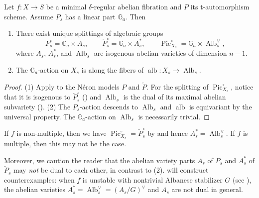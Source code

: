 \documentclass[reqno, letterpaper]{amsart}
\numberwithin{equation}{subsection}
\let\to\longrightarrow
\newcommand{\GG}{\mathbb{G}}
\DeclareMathOperator{\Pic}{Pic}
\DeclareMathOperator{\Alb}{Alb}
\DeclareMathOperator{\alb}{alb}
\begin{document}
		\begin{proposition} \label{prop:splitting and albanese}
			Let $f : X \to S$ be a minimal $\delta$-regular abelian fibration and $P$ its t-automorphism scheme. Assume $P_s$ has a linear part $\GG_a$. Then
			\begin{enumerate}
				\item There exist unique splittings of algebraic groups
				\[ P^\circ_s = \GG_a \times A_s ,\qquad \check P^\circ_s = \GG_a \times A_s^* ,\qquad \Pic^\circ_{X_s} = \GG_a \times \Alb_s^\vee ,\]
				where $A_s$, $A_s^*$, and $\Alb_s$ are isogenous abelian varieties of dimension $n-1$.
				\item The $\GG_a$-action on $X_s$ is along the fibers of $\alb : X_s \to \Alb_s$.
			\end{enumerate}
		\end{proposition}
		\begin{proof}
			(1) Apply  to the N\'eron models $P$ and $\check P$. For the splitting of $\Pic^\circ_{X_s}$, notice that it is isogenous to $\check P^\circ_s$ () and $\Alb_s$ is the dual of its maximal abelian subvariety (). (2) The $P_s$-action descends to $\Alb_s$ and $\alb$ is equivariant by the universal property. The $\GG_a$-action on $\Alb_s$ is necessarily trivial.
		\end{proof}
		
		\begin{remark} \label{rmk:abelian varieties are not dual}
			If $f$ is non-multiple, then we have $\Pic^\circ_{X_s} = \check P_s^\circ$ by  and hence $A_s^* = \Alb_s^\vee$. If $f$ is multiple, then this may not be the case.
			
			Moreover, we caution the reader that the abelian variety parts $A_s$ of $P_s$ and $A_s^*$ of $\check P_s$ may \emph{not} be dual to each other, in contrast to (2).  will construct counterexamples: when $f$ is unstable with nontrivial Albanese stabilizer $G$ (see ), the abelian varieties $A_s^* = \Alb_s^\vee = (A_s / G)^\vee$ and $A_s$ are not dual in general.
		\end{remark}
		
\end{document}
